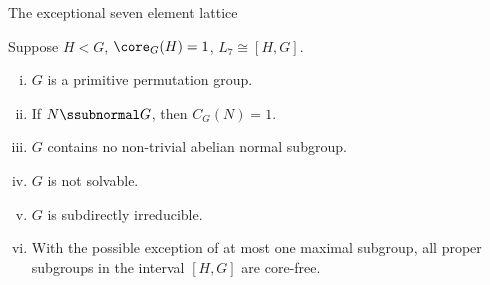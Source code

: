 \begin{frame}[fragile,label=NewConclusion,shrink=5]{The exceptional seven element lattice}
      \begin{center}
      \end{center}
    \begin{theorem}
      \label{thm:except-seven-elem}
      Suppose $H<G$, \hskip2mm $\core_G(H) = 1$, \hskip2mm $L_7 \cong [H,G]$.
      \begin{enumerate}[(i)]
      \item<1-> $G$ is a primitive permutation group.
      \item<1-> If $N\ssubnormal G$, then $C_G(N) = 1$.
      \item<1-> $G$ contains no non-trivial abelian normal subgroup.
      \item<1-> $G$ is not solvable.
      \item<1-> $G$ is subdirectly irreducible.
      \item<1-> With the possible exception of at most one maximal subgroup, %
        all proper subgroups in the interval $[H,G]$ are core-free. 
      \end{enumerate}
    \end{theorem}

\end{frame}








